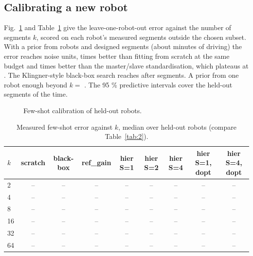 \subsection{Calibrating a new robot}\label{sec:hw-fewshot}

Fig.~\ref{fig:fewshot} and Table~\ref{tab:hw-fewshot} give the
leave-one-robot-out error against the number of segments \(k\), scored
on each robot's measured segments outside the chosen subset. With a
prior from  robots and  designed segments (about 
minutes of driving) the error reaches  noise units,  times
better than fitting from scratch at the same budget and  times
better than the master/slave standardisation, which plateaus at .
The Klingner-style black-box search reaches  after 
segments. A prior from one robot  enough beyond \(k =
\) . The 95 \% predictive intervals cover the held-out segments
 of the time. 

\begin{figure}[t]
\centering
{}
\caption{Few-shot calibration of held-out robots. }
\label{fig:fewshot}
\end{figure}

\begin{table}[t]
\caption{Measured few-shot error against \(k\), median over held-out robots (compare Table~\ref{tab:2}). }
\label{tab:hw-fewshot}
\centering\footnotesize
\begin{tabular}{lcccccccc}
\toprule
\(k\) & scratch & black-box & ref\_gain & hier S=1 & hier S=2 & hier S=4 & hier S=1, dopt & hier S=4, dopt \\
\midrule
2 & -- & -- & -- & -- & -- & -- & -- & -- \\
4 & -- & -- & -- & -- & -- & -- & -- & -- \\
8 & -- & -- & -- & -- & -- & -- & -- & -- \\
16 & -- & -- & -- & -- & -- & -- & -- & -- \\
32 & -- & -- & -- & -- & -- & -- & -- & -- \\
64 & -- & -- & -- & -- & -- & -- & -- & -- \\
\bottomrule
\end{tabular}
\end{table}

